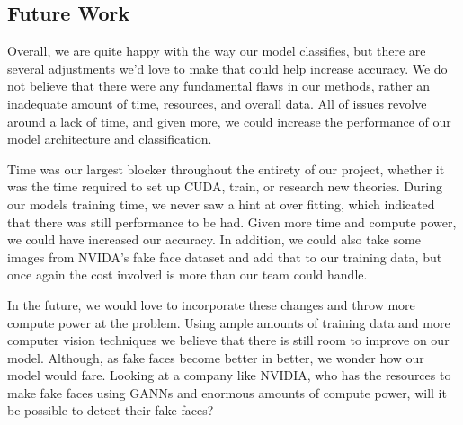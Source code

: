 \documentclass[11pt, letterpaper]{article}
\begin{document}
\begin{multicols}{2}
  \subsection{Future Work}
  Overall, we are quite happy with the way our model classifies, but there are
  several adjustments we'd love to make that could help increase accuracy. We do
  not believe that there were any fundamental flaws in our methods, rather an
  inadequate amount of time, resources, and overall data. All of issues revolve
  around a lack of time, and given more, we could increase the performance of
  our model architecture and classification. 
  
  Time was our largest blocker throughout the entirety of our project, whether
  it was the time required to set up CUDA, train, or research new theories.
  During our models training time, we never saw a hint at over fitting, which
  indicated that there was still performance to be had. Given more time and
  compute power, we could have increased our accuracy. In addition, we could
  also take some images from NVIDA's fake face dataset and add that to our
  training data, but once again the cost involved is more than our team could
  handle. 
  
  In the future, we would love to incorporate these changes and throw more
  compute power at the problem. Using ample amounts of training data and more
  computer vision techniques we believe that there is still room to improve on
  our model. Although, as fake faces become better in better, we wonder how our
  model would fare. Looking at a company like NVIDIA, who has the resources to
  make fake faces using GANNs and enormous amounts of compute power, will it be
  possible to detect their fake faces? 
  
\end{multicols}



\end{document}
